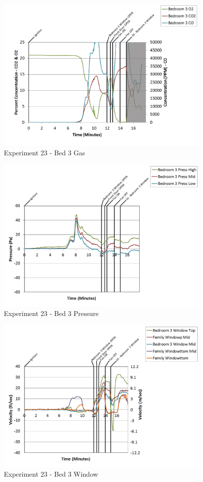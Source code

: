 \documentclass{article}
\begin{document}
\begin{appendices}
\clearpage

\begin{figure}[h!]
	\centering
	\includegraphics[height=3.05in]{0_Images/Results_Charts/Exp_23_Charts/Bed3Gas.png}
	\caption{Experiment 23 - Bed 3 Gas}
\end{figure}


\begin{figure}[h!]
	\centering
	\includegraphics[height=3.05in]{0_Images/Results_Charts/Exp_23_Charts/Bed3Pressure.png}
	\caption{Experiment 23 - Bed 3 Pressure}
\end{figure}

\clearpage

\begin{figure}[h!]
	\centering
	\includegraphics[height=3.05in]{0_Images/Results_Charts/Exp_23_Charts/Bed3Window.png}
	\caption{Experiment 23 - Bed 3 Window}
\end{figure}



\end{appendices}
\end{document}

